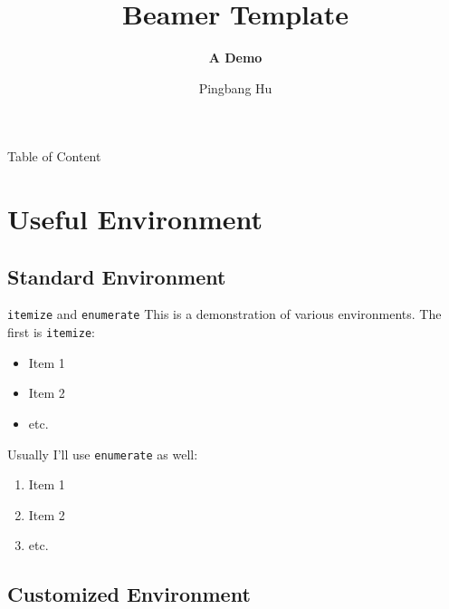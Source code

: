 \documentclass[aspectratio=169, xcolor={dvipsnames}, hyperref={colorlinks=true,linkcolor=Dandelion,urlcolor=magenta,citecolor=violet, hyperfootnotes=true}]{beamer}
\title[Template]{Beamer Template}
\subtitle{\textbf{A Demo}}
\institute[UIUC]{University of Illinois Urbana-Champaign}
\author{Pingbang Hu}
\begin{document}
\begin{frame}
    \titlepage
\end{frame}

\begin{frame}{Table of Content}
    \tableofcontents
\end{frame}


\section{Useful Environment}
\subsection{Standard Environment}
\begin{frame}{\texttt{itemize} and \texttt{enumerate}}
    This is a demonstration of various environments. The first is \texttt{itemize}:

    \begin{itemize}
        \item Item 1
        \item Item 2
        \item etc.
    \end{itemize}

    Usually I'll use \texttt{enumerate} as well:

    \begin{enumerate}
        \item Item 1
        \item Item 2
        \item etc.
    \end{enumerate}
\end{frame}

\subsection{Customized Environment}
\end{document}
